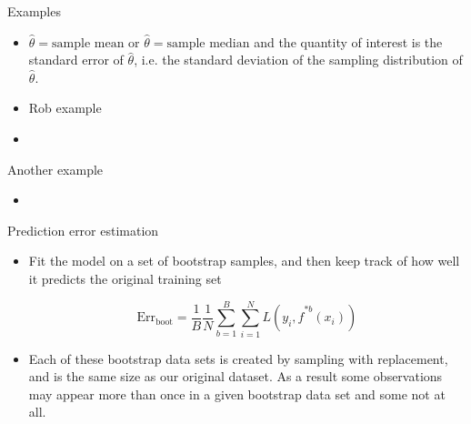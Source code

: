 \documentclass[14pt]{beamer}
\begin{document}
\begin{frame}[plain]{Examples}

\begin{itemize}
	\item $\hat \theta = \text{sample mean}$ or $\hat \theta = \text{sample median}$  and the quantity of interest is the standard error of $\hat \theta$, i.e. the standard deviation of the sampling distribution of $\hat \theta$.
	\item Rob example
\end{itemize}



\begin{itemize}
	\item 
\end{itemize}
\end{frame}

\begin{frame}[plain]{Another example}

\begin{itemize}
	\item
\end{itemize}
\end{frame}



\begin{frame}[plain]{Prediction error estimation}

\begin{itemize}
	\item Fit the model on a set of bootstrap samples, and then keep track of how well it predicts the original training set
	
	$$ \text{Err}_{\text{boot}} = \frac1B \frac1N \sum_{b = 1}^B \sum_{i = 1}^N L(y_i, \hat f^{*b}(x_i))$$ 
	\pause
	\item Each of these bootstrap data sets is created by sampling with replacement, and is the same size as our original dataset. As a result some observations may appear more than once in a given bootstrap data set and some not at all.
\end{itemize}

\end{frame}
\end{document}
